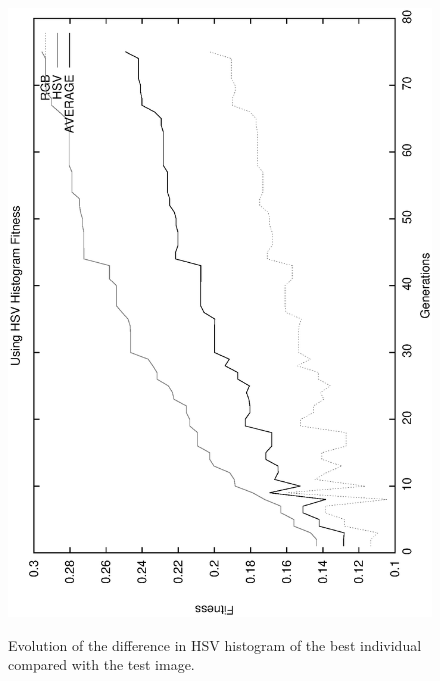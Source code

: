 \documentclass[conference]{IEEEtran}
\begin{document}
\begin{figure}
   \includegraphics[scale =0.4] {images/hsvgens.eps}
\label{fig:gensrgb}
\caption{Evolution of the difference in HSV histogram of the best individual compared with the test image. }
\end{figure}
\end{document}
